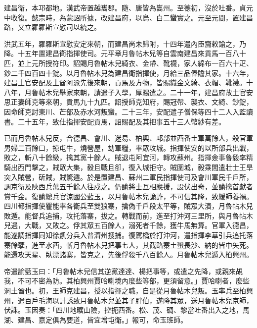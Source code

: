 \begin{pinyinscope}
建昌衛，本邛都地。漢武帝置越巂郡。隨、唐皆為巂州。至德初，沒於吐番。貞元中收復。懿宗時，為蒙詔所據，改建昌府，以烏、白二蠻實之。元至元間，置建昌路，又立羅羅斯宣慰司以統之。

洪武五年，羅羅斯宣慰安定來朝，而建昌尚未歸附，十四年遣內臣齎敕諭之，乃降。十五年置建昌衛指揮使司。元平章月魯帖木兒等自雲南建昌來貢馬一百八十匹，並上元所授符印。詔賜月魯帖木兒綺衣、金帶、靴襪，家人綿布一百六十疋、鈔二千四百四十錠。以月魯帖木兒為建昌衛指揮使，月給三品俸贍其家。十六年，建昌土官安配及土酋阿派先後來朝，貢馬及方物，皆賜織金文綺、衣帽、靴襪。十八年，月魯帖木兒舉家來朝，請遣子入學，厚賜遣之。二十一年，建昌府故土官安思正妻師克等來朝，貢馬九十九匹。詔授師克知府，賜冠帶、襲衣、文綺、鈔錠，因命師克討東川、芒部及赤水河叛蠻。二十三年，安配遣子僧保等四十二人入監讀書。二十五年，致仕指揮安配貢馬，詔賜配及其把事五十三人幣紗有差。

已而月魯帖木兒反，合德昌、會川、迷易、柏興、邛部並西番土軍萬餘人，殺官軍男婦二百餘口，掠屯牛，燒營屋，劫軍糧，率眾攻城。指揮使安的以所部兵出戰，敗之，斬八十餘級，擒其黨十餘人。賊退屯阿宜河，轉攻蘇州。指揮僉事魯毅率精騎出西門擊之，賊眾大集，毅且戰且卻，復入城拒守。賊圍城，毅乘間遣壯士王旱突入賊營，斫賊，賊驚遁。於是置建昌、蘇州二軍民指揮使司及會川軍民千戶所，調京衛及陜西兵萬五千餘人往戍之。仍諭將士互相應援，設伏出奇，並諭擒首獻者賞千金。復諭總兵官涼國公藍玉，以月魯帖木兒詭詐，不可信其降，致緩師養禍。四川都指揮使瞿能率各衛兵至雙狼寨，擒偽千戶段太平等，賊眾大潰，月魯帖木兒敗遁。能督兵追捕，攻托落寨，拔之。轉戰而前，進至打沖河三里所，與月魯帖木兒遇，大戰，又敗之。俘其眾五百餘人，溺死者千餘，獲牛馬無算。官軍入德昌，能遂調指揮同知徐凱分兵入普濟州搜捕。復駕橋於打沖河，遣指揮李華引兵追托落寨餘孽，進至水西，斬月魯帖木兒把事七人，其截路寨土蠻長沙、納的皆中矢死。能還攻天星、臥漂諸寨，皆克之，先後俘殺千八百餘人。月魯帖木兒遁入柏興州。

帝遣諭藍玉曰：「月魯帖木兒信其逆黨達達、楊把事等，或遣之先降，或親來覘我，不可不密為防。其柏興州賈哈喇境內麼些等部，更須留意。」賈哈喇者，麼些洞土酋也。初，王師克建昌，授以指揮之職，自是從月魯帖木兒叛。玉率兵至柏興州，遣百戶毛海以計誘致月魯帖木兒並其子胖伯，遂降其眾，送月魯帖木兒京師，伏誅。玉因奏：「四川地曠山險，控扼西番。松、茂、碉、黎當吐番出入之地，馬湖、建昌、嘉定俱為要道，皆宜增屯衛。」報可，命玉班師。


\end{pinyinscope}
